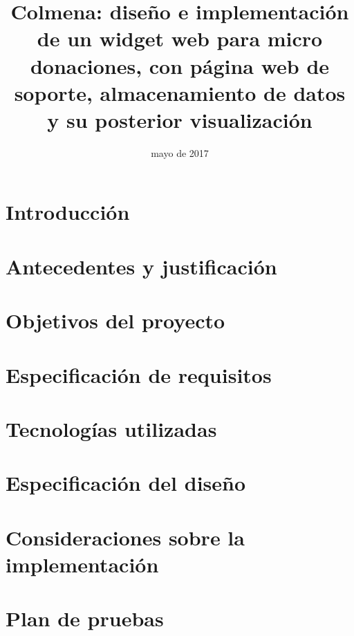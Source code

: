 \documentclass{memoriaPFC}
\title{Colmena: diseño e implementación de un widget web para micro donaciones, con página web de soporte, almacenamiento de datos y su posterior visualización}
\date{mayo de 2017}
\begin{document}
\frontmatter

\hacerresumen
\tableofcontents
\listoffigures %
\listoftables %
\lstlistoflistings %

\mainmatter
\chapter{Introducción}



\chapter{Antecedentes y justificación}



\chapter{Objetivos del proyecto}



\chapter{Especificación de requisitos}



\chapter{Tecnologías utilizadas}



\chapter{Especificación del diseño}



\chapter{Consideraciones sobre la implementación}



\chapter{Plan de pruebas}
\end{document}

